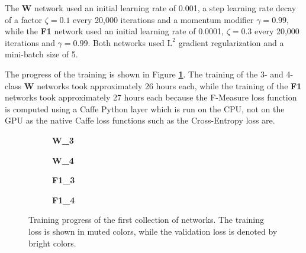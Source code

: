 The \textbf{W} network used an initial learning rate of 0.001, a step learning rate decay of a factor $\zeta = 0.1$ every 20,000 iterations and a momentum modifier $\gamma = 0.99$, while the \textbf{F1} network used an initial learning rate of 0.0001, $\zeta = 0.3$ every 20,000 iterations and $\gamma = 0.99$. Both networks used $\text{L}^2$ gradient regularization and a mini-batch size of 5.

The progress of the training is shown in Figure \textbf{\ref{fig:weighted_f1_training}}. The training of the 3- and 4-class \textbf{W} networks took approximately 26 hours each, while the training of the \textbf{F1} networks took approximately 27 hours each because the F-Measure loss function is computed using a Caffe Python layer which is run on the CPU, not on the GPU as the native Caffe loss functions such as the Cross-Entropy loss are.\\

\begin {figure}[!htb]
	\begin {subfigure}[b]{0.4\linewidth}
		\scalebox{0.65}{}
		\caption{\textbf{W\_3}}
	\end {subfigure}\hspace{1.75cm}
	\begin {subfigure}[b]{0.4\linewidth}
		\scalebox{0.65}{}
		\caption{\textbf{W\_4}}
	\end {subfigure}

	\begin {subfigure}[b]{0.4\linewidth}
		\scalebox{0.65}{}
		\caption{\textbf{F1\_3}}
	\end {subfigure}\hspace{1.75cm}
	\begin {subfigure}[b]{0.4\linewidth}
		\scalebox{0.65}{}
		\caption{\textbf{F1\_4}}
	\end {subfigure}

		\caption[Training progress of the first collection of networks.]{Training progress of the first collection of networks. The training loss is shown in muted colors, while the validation loss is denoted by bright colors.}
		\label{fig:weighted_f1_training}
\end {figure}


